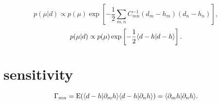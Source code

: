 \begin{equation}
    p(\mu|d)\propto p(\mu)\exp\left[-\frac{1}{2}\sum_{m,n}C_{mn}^{-1}(d_m-h_m)(d_n-h_n)\right],
\end{equation}
\begin{equation}
    p(\mu|d)\propto p(\mu)\exp\left[-\frac{1}{2}\langle d-h|d-h \rangle\right].
\end{equation}

\section{sensitivity}

\begin{equation}
    \Gamma_{mn}=\text{E}(\langle d-h|\partial_m h\rangle\langle d-h|\partial_n h \rangle)=\langle \partial_m h|\partial_n h \rangle.
\end{equation}
